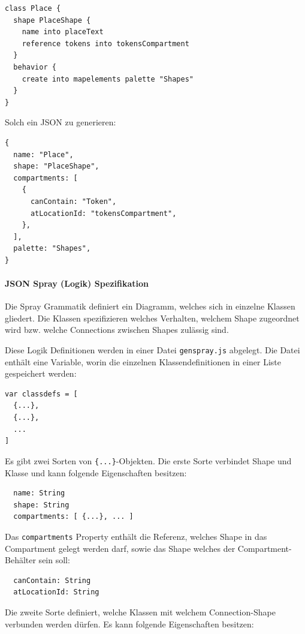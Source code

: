 \begin{verbatim}
class Place {
  shape PlaceShape {
    name into placeText
    reference tokens into tokensCompartment
  }
  behavior {
    create into mapelements palette "Shapes"
  }
} 
\end{verbatim}

\noindent Solch ein JSON zu generieren:

\begin{verbatim}
{
  name: "Place",
  shape: "PlaceShape",
  compartments: [
    {
      canContain: "Token",
      atLocationId: "tokensCompartment",
    },
  ],
  palette: "Shapes",
}
\end{verbatim}

\paragraph{JSON Spray (Logik) Spezifikation} Die Spray Grammatik definiert
ein Diagramm, welches sich in einzelne Klassen gliedert.
Die Klassen spezifizieren welches Verhalten, welchem Shape zugeordnet wird
bzw. welche Connections zwischen Shapes zulässig sind.

Diese Logik Definitionen werden in einer Datei {\tt genspray.js} abgelegt.
Die Datei enthält eine Variable, worin die einzelnen Klassendefinitionen
in einer Liste gespeichert werden:

\begin{verbatim}
var classdefs = [
  {...},
  {...},
  ...
]
\end{verbatim}

\noindent Es gibt zwei Sorten von \verb|{...}|-Objekten.
Die erste Sorte verbindet Shape und Klasse und kann
folgende Eigenschaften besitzen:

\begin{verbatim}
  name: String
  shape: String
  compartments: [ {...}, ... ]
\end{verbatim}

\noindent Das {\tt compartments} Property enthält die Referenz,
welches Shape in das Compartment gelegt werden darf, sowie das
Shape welches der Compartment-Behälter sein soll:

\begin{verbatim}
  canContain: String
  atLocationId: String
\end{verbatim}

\noindent Die zweite Sorte definiert, welche Klassen mit welchem
Connection-Shape verbunden werden dürfen. Es kann folgende Eigenschaften
besitzen:

